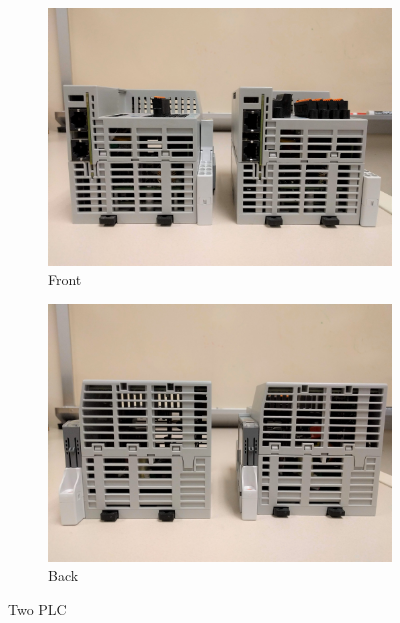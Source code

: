 \begin{figure}[tp]
	\centering
    \begin{subfigure}[b]{0.23\textwidth}
    	\centering
	\includegraphics[width=1\textwidth]{figures/eval_b2}
        \vspace{-0.15in}
        \caption{Front}
		\label{fig:eval_b1}
	\end{subfigure}
	\begin{subfigure}[b]{0.23\textwidth}
    	\centering
	\includegraphics[width=1\textwidth]{figures/eval_b1}
        \vspace{-0.15in}
	\caption{Back}
		\label{fig:eval_b2}
	\end{subfigure}
    \vspace{-0.15in}
	\caption{Two PLC}
	\vspace{-0.15in}
    \label{fig:attack1}
\end{figure}

